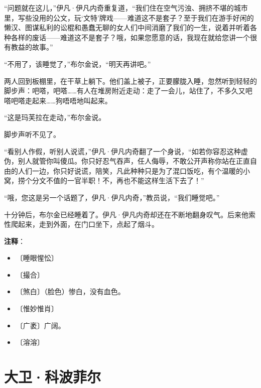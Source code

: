 \documentclass[12pt,UTF-8,openany]{ctexbook}
\begin{document}
\begin{large}
    “问题就在这儿，”伊凡·伊凡内奇重复道，“我们住在空气污浊、拥挤不堪的城市里，写些没用的公文，玩‘文特’牌戏——难道这不是套子？至于我们在游手好闲的懒汉、图谋私利的讼棍和愚蠢无聊的女人们中间消磨了我们的一生，说着并听着各种各样的废话——难道这不是套子？哦，如果您愿意的话，我现在就给您讲一个很有教益的故事。”
    
    “不用了，该睡觉了，”布尔金说，“明天再讲吧。”
    
    两人回到板棚里，在干草上躺下。他们盖上被子，正要朦胧入睡，忽然听到轻轻的脚步声：吧嗒，吧嗒……有人在堆房附近走动：走了一会儿，站住了，不多久又吧嗒吧嗒走起来……狗唔唔地叫起来。
    
    “这是玛芙拉在走动，”布尔金说。
    
    脚步声听不见了。
    
    “看别人作假，听别人说谎，”伊凡·伊凡内奇翻了一个身说，“如若你容忍这种虚伪，别人就管你叫傻瓜。你只好忍气吞声，任人侮辱，不敢公开声称你站在正直自由的人们一边，你只好说谎，陪笑，凡此种种只是为了混口饭吃，有个温暖的小窝，捞个分文不值的一官半职！不，再也不能这样生活下去了！”
    
    “哦，您这是另一个话题了，伊凡·伊凡内奇，”教员说，“我们睡觉吧。”
    
    十分钟后，布尔金已经睡着了。伊凡·伊凡内奇却还在不断地翻身叹气。后来他索性爬起来，走到外面，在门口坐下，点起了烟斗。
    
\end{large}


\newpage

\textbf{注释}：

\vspace{-1em}

\begin{itemize}
    \setlength\itemsep{-0.2em}
    \item 〔睡眼惺忪〕
    \item 〔撮合〕
    \item 〔煞白〕（脸色）惨白，没有血色。
    \item 〔惟妙惟肖〕
    \item 〔广袤〕广阔。
    \item 〔溶溶〕
\end{itemize}

\chapter{大卫·科波菲尔}
\end{document}
